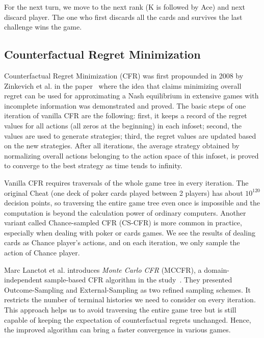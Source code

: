 \documentclass[runningheads]{llncs}
\begin{document}
    For the next turn, we move to the next rank (K is followed by Ace) and next discard player. The one who first discards all the cards and survives the last challenge wins the game.

    \subsection{Counterfactual Regret Minimization}
    
    Counterfactual Regret Minimization (CFR) was first propounded in 2008 by Zinkevich et al. in the paper~\cite{zinkevich2008regret} where the idea that claims minimizing overall regret can be used for approximating a Nash equilibrium in extensive games with incomplete information was demonstrated and proved. The basic steps of one iteration of vanilla CFR are the following: first, it keeps a record of the regret values for all actions (all zeros at the beginning) in each infoset; second, the values are used to generate strategies; third, the regret values are updated based on the new strategies. After all iterations, the average strategy obtained by normalizing overall actions belonging to the action space of this infoset, is proved to converge to the best strategy as time tends to infinity.
    
    Vanilla CFR requires traversals of the whole game tree in every iteration. The original Cheat (one deck of poker cards played between 2 players) has about $10^120$ decision points, so traversing the entire game tree even once is impossible and the computation is beyond the calculation power of ordinary computers. Another variant called Chance-sampled CFR (CS-CFR) is more common in practice, especially when dealing with poker or cards games. We see the results of dealing cards as Chance player's actions, and on each iteration, we only sample the action of Chance player.
    
    Marc Lanctot et al. introduces \textit{Monte Carlo CFR} (MCCFR), a domain-independent sample-based CFR algorithm in the study~\cite{lanctot2009monte}. They presented Outcome-Sampling and External-Sampling as two refined sampling schemes. It restricts the number of terminal histories we need to consider on every iteration. This approach helps us to avoid traversing the entire game tree but is still capable of keeping the expectation of counterfactual regrets unchanged. Hence, the improved algorithm can bring a faster convergence in various games.
    
\end{document}
